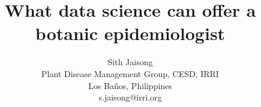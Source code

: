 \documentclass[12pt,a4paper]{article}
\begin{document}
\thispagestyle{empty}

\title{\textbf{What data science can offer a botanic epidemiologist}}
\author{Sith Jaisong \\
Plant Disease Management Group, CESD, IRRI\\ Los Ba\~{n}os, Philippines\\
s.jaisong@irri.org}
\date{} %
\maketitle\thispagestyle{empty} %


%
%
%
%
%
\end{document}
